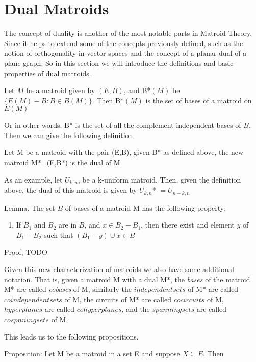 \section{Dual Matroids}
The concept of duality is another of the most notable parts in Matroid Theory. Since it helps to extend some of the concepts previously defined, such as the notion of orthogonality in vector spaces and the concept of a planar dual of a plane graph. So in this section we will introduce the definitions and basic properties of dual matroids.

\begin{theorem}
    Let $M$ be a matroid given by $(E,B)$, and B*$(M)$ be $\{E(M) - B:B\in B(M)\}$. Then B*$(M)$ is the set of bases of a matroid on $E(M)$
\end{theorem}

Or in other words, B* is the set of all the complement independent bases of $B$. Then we can give the following definition.

\begin{defn}
    Let M be a matroid with the pair (E,B), given B* as defined above, the new matroid M*=(E,B*) is the dual of M.
\end{defn}

As an example, let $U_{k,n}$, be a k-uniform matroid. Then, given the definition above, the dual of this matroid is given by $U_{k,n}$* $= U_{n-k,n}$

Lemma. The set $B$ of bases of a matroid M has the following property:
\begin{enumerate}
    \item If $B_1$ and $B_2$ are in $B$, and $x\in B_2 - B_1$, then there exist and element $y$ of $B_1 - B_2$ such that $(B_1 - y) \cup x \in B$ 
\end{enumerate}

Proof, TODO


Given this new characterization of matroids we also have some additional notation. That is, given a matroid M with a dual M*, the \textit{bases} of the matroid M* are called \textit{cobases} of M, similarly the $independent sets$ of M* are called $coindependent sets$ of M, the circuits of M* are called $cocircuits$ of M, $hyperplanes$ are called $cohyperplanes$, and the $spanning sets$ are called $cospnning sets$ of M.

This leads us to the following propositions.

Proposition:
Let M be a matroid in a set E and suppose $X \subseteq E$. Then

